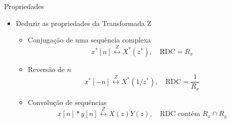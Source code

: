 \begin{slide}{Propriedades}
\begin{itemize}
 \item Deduzir as propriedades da Transformada Z
   \begin{itemize}
      \item Conjugação de uma sequência complexa
      \begin{equation*} 
        x^*[n] \overset{Z}{\longleftrightarrow} X^*(z^*), \quad \text{RDC}=R_x
      \end{equation*}
      \item Reversão de $n$
      \begin{equation*} 
        x^*[-n] \overset{Z}{\longleftrightarrow} X^*(1/z^*), \quad \text{RDC}=\frac{1}{R_x}
      \end{equation*}
      \item Convolução de sequências
      \begin{equation*} 
        x[n]*y[n] \overset{Z}{\longleftrightarrow} X(z)Y(z), \quad \text{RDC contém } R_x\cap R_y
      \end{equation*}
   \end{itemize}
\end{itemize}
\end{slide}


